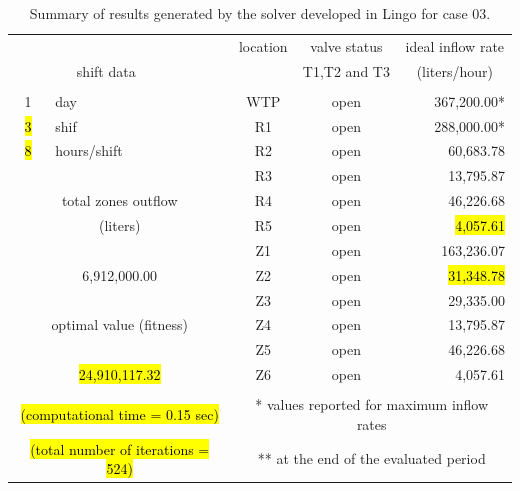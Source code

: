 \documentclass{singlecol}
\theoremstyle{TH}{
\newtheorem{lemma}{Lemma}
\newtheorem{theorem}[lemma]{Theorem}
\newtheorem{corrolary}[lemma]{Corrolary}
\newtheorem{conjecture}[lemma]{Conjecture}
\newtheorem{proposition}[lemma]{Proposition}
\newtheorem{claim}[lemma]{Claim}
\newtheorem{stheorem}[lemma]{Wrong Theorem}
\newtheorem{algorithm}{Algorithm}
}
\theoremstyle{THrm}{
\newtheorem{definition}{Definition}[section]
\newtheorem{question}{Question}[section]
\newtheorem{remark}{Remark}
\newtheorem{scheme}{Scheme}
}
\theoremstyle{THhit}{
\newtheorem{case}{Case}[section]
}
\begin{document}
\begin{table}[t]
\begin{center}
\begin{small}
\begin{tabular}{ c r r r r r }
		   \\
		&  &      &  \multicolumn{1}{c}{location}    & \multicolumn{1}{c}{valve status} & \multicolumn{1}{c}{ideal inflow rate}   \\
		\multicolumn{2}{c}{shift data}     &   &      & \multicolumn{1}{c}{T1,T2 and T3} & \multicolumn{1}{c}{(liters/hour)} \\
		   \\
		1   &  \multicolumn{1}{l}{day}   &              	& \multicolumn{1}{c}{WTP} & \multicolumn{1}{c}{open} &  367,200.00* \\
		\hl{3}   &  \multicolumn{1}{l}{shif}  &         			& \multicolumn{1}{c}{R1}  & \multicolumn{1}{c}{open} &  288,000.00* \\
		\hl{8}  &  \multicolumn{1}{l}{hours/shift}        &     & \multicolumn{1}{c}{R2}  & \multicolumn{1}{c}{open} &   60,683.78  \\
	   &      &              								& \multicolumn{1}{c}{R3}  & \multicolumn{1}{c}{open} &   13,795.87  \\
	   \multicolumn{3}{c}{total zones outflow}              & \multicolumn{1}{c}{R4}  & \multicolumn{1}{c}{open} &   46,226.68  \\
	   \multicolumn{3}{c}{(liters)}              		    & \multicolumn{1}{c}{R5}  & \multicolumn{1}{c}{open} &    \hl{4,057.61}  \\
	   &      &              								& \multicolumn{1}{c}{Z1}  & \multicolumn{1}{c}{open} &  163,236.07  \\
	   \multicolumn{3}{c}{6,912,000.00}              		& \multicolumn{1}{c}{Z2}  & \multicolumn{1}{c}{open} &   \hl{31,348.78}  \\
	      &              &              					& \multicolumn{1}{c}{Z3}  & \multicolumn{1}{c}{open} &   29,335.00  \\
	   \multicolumn{3}{c}{optimal value (fitness)}          & \multicolumn{1}{c}{Z4}  & \multicolumn{1}{c}{open} &   13,795.87  \\
	   &             &             						 	& \multicolumn{1}{c}{Z5}  & \multicolumn{1}{c}{open} &   46,226.68  \\
	   \multicolumn{3}{c}{\hl{24,910,117.32}}                     & \multicolumn{1}{c}{Z6}  & \multicolumn{1}{c}{open} &    4,057.61 \\
	   \\
	   \multicolumn{3}{c}{\hl{(computational time  = 0.15 sec)}}     & \multicolumn{3}{c}{* values reported for maximum inflow rates} \\
	   \multicolumn{3}{c}{\hl{(total number of iterations = 524)}}   & \multicolumn{3}{c}{** at the end of the evaluated period} 
	\end{tabular}
		\end{small}
\caption{Summary of results generated by the solver developed in Lingo for case 03.}
\label{tab:lingoEvalCase03}
\end{center}
\end{table}
\end{document}
